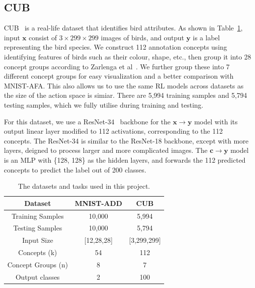 \documentclass[../main.tex]{subfiles}
\begin{document}
\subsection{CUB}

CUB~\cite{cub} is a real-life dataset that identifies bird attributes.
As shown in Table~\ref{table:datasets}, 
input $\mathbf{x}$ consist of $3 \times 299 \times 299$ images of 
 birds, and output $\mathbf{y}$ is a label representing the bird species.
We construct
112 annotation concepts 
using identifying features of birds such as their colour, shape, etc.,
then group it into 28 concept groups according
to Zarlenga et al~\cite{intcem}. We further group these
into 7 different concept groups for easy visualization and a better comparison
with MNIST-AFA. This also allows us to use the same RL models across datasets
as the size of the action space is simiar. There are 
5,994 training samples and 5,794 testing samples, which we fully
utilise during training and testing.

For this dataset, we use a ResNet-34~\cite{resnet} backbone for the $\mathbf{x} \to \mathbf{y}$
model with its output linear layer modified to 112 activations, corresponding
to the 112 concepts. The ResNet-34 is similar to the ResNet-18 backbone,
except with more layers, deigned to process larger and more complicated images.
The $\mathbf{c} \to \mathbf{y}$ model is an MLP with \{128, 128\} as the hidden
layers, and forwards the 112 predicted concepts to predict the label out of 200 classes.


\begin{table}
    \centering
    \renewcommand{\arraystretch}{1.5}
    \begin{tabular}{c|cc}

    Dataset & MNIST-ADD & CUB \\
    \hline
    Training Samples & 10,000 & 5,994 \\
    Testing Samples & 10,000 & 5,794 \\
    Input Size & [12,28,28] & [3,299,299]\\
    Concepts (k) & 54 & 112 \\
    Concept Groups (n) & 8 & 7 \\
    Output classes & 2 & 100
    \end{tabular}
    \caption{The datasets and tasks used in this project.}
    \label{table:datasets}
\end{table}
\end{document}
